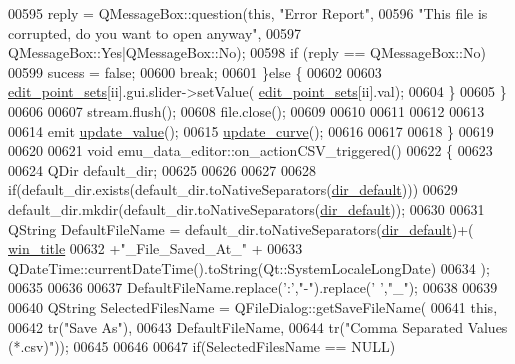 \begin{DoxyCode}
{00595                  reply = QMessageBox::question(\textcolor{keyword}{this}, \textcolor{stringliteral}{"Error Report"},
00596                                                \textcolor{stringliteral}{"This file is corrupted, do you want to open anyway"},
00597                                                QMessageBox::Yes|QMessageBox::No);
00598                  \textcolor{keywordflow}{if} (reply == QMessageBox::No)
00599                   sucess = \textcolor{keyword}{false};
00600                   \textcolor{keywordflow}{break};
00601              \}\textcolor{keywordflow}{else} \{
00602 
00603                   \hyperlink{a00004_ab093b86d07b4eb96c36878089a7d97df}{edit\_point\_sets}[ii].gui.slider->setValue(
      \hyperlink{a00004_ab093b86d07b4eb96c36878089a7d97df}{edit\_point\_sets}[ii].val);
00604              \}
00605              \}
00606 
00607        stream.flush();
00608        file.close();
00609 
00610 
00611 
00612 
00613 
00614        emit \hyperlink{a00004_ad5f20fdbb4731185020ff4e90cd1ead2}{update\_value}();
00615        \hyperlink{a00004_a15cbcf5f0a17281468800f47898f60c1}{update\_curve}();
00616 
00617 
00618 \}
00619 
00620 
00621 \textcolor{keywordtype}{void} emu\_data\_editor::on\_actionCSV\_triggered()
00622 \{
00623 
00624     QDir default\_dir;
00625 
00626 
00627 
00628     \textcolor{keywordflow}{if}(default\_dir.exists(default\_dir.toNativeSeparators(\hyperlink{a00004_aa55b7d8008e31fcc971692b493e7cf34}{dir\_default})))
00629         default\_dir.mkdir(default\_dir.toNativeSeparators(\hyperlink{a00004_aa55b7d8008e31fcc971692b493e7cf34}{dir\_default}));
00630 
00631     QString DefaultFileName =  default\_dir.toNativeSeparators(\hyperlink{a00004_aa55b7d8008e31fcc971692b493e7cf34}{dir\_default})+(
      \hyperlink{a00004_a2abdde44f37258778dcc571e8cc7ed1a}{win\_title}
00632                                                                             +\textcolor{stringliteral}{"\_File\_Saved\_At\_"} +
00633                                QDateTime::currentDateTime().toString(Qt::SystemLocaleLongDate)
00634                                );
00635 
00636 
00637     DefaultFileName.replace(\textcolor{charliteral}{':'},\textcolor{stringliteral}{"-"}).replace(\textcolor{charliteral}{' '},\textcolor{stringliteral}{"\_"});
00638 
00639 
00640     QString SelectedFilesName = QFileDialog::getSaveFileName(
00641         \textcolor{keyword}{this},
00642         tr(\textcolor{stringliteral}{"Save As"}),
00643         DefaultFileName,
00644         tr(\textcolor{stringliteral}{"Comma Separated Values (*.csv)"}));
00645 
00646 
00647     \textcolor{keywordflow}{if}(SelectedFilesName == NULL)
}
\end{DoxyCode}
